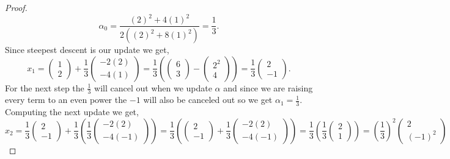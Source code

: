 \documentclass[12pt]{article}
\makeatletter
\theoremstyle{homework}
\newenvironment{exercise}[1]
{\def\@currentlabel{#1}\exercisecore}
{\endexercisecore}
\makeatother
\begin{document}
\begin{exercise}{2.3}
\begin{enumerate}
\begin{proof}
\begin{equation*}
        \alpha_0 = \frac{(2)^2 + 4(1)^2}{2((2)^2 + 8(1)^2)} = \frac{1}{3}. 
      \end{equation*}
      Since steepest descent is our update we get, 
      \begin{equation*}
        x_1 = \begin{pmatrix}
          1\\
          2
        \end{pmatrix} + \frac{1}{3}\begin{pmatrix}-2(2)\\-4(1)\end{pmatrix} = \frac{1}{3} \left(\begin{pmatrix}6\\ 3\end{pmatrix}  - \begin{pmatrix} 2^2\\ 4\end{pmatrix}\right) = \frac{1}{3} \begin{pmatrix} 2\\ -1\end{pmatrix}.
      \end{equation*}
      For the next step the $\frac{1}{3}$ will cancel out when we update $\alpha$ and since we are raising every term to
      an even power the $-1$ will also be canceled out so we get $\alpha_1 = \frac{1}{3}$. Computing the next update we get, 
      \begin{equation*}
        x_2 = \frac{1}{3}\begin{pmatrix} 2\\ -1\end{pmatrix} + \frac{1}{3}\left(\frac{1}{3} \begin{pmatrix}-2(2)\\ -4(-1)\end{pmatrix}\right) = \frac{1}{3} \left(  \begin{pmatrix} 2\\ -1\end{pmatrix} + \frac{1}{3} \begin{pmatrix}-2(2)\\ -4(-1)\end{pmatrix}\right) = \frac{1}{3}\left( \frac{1}{3} \begin{pmatrix} 2\\ 1\end{pmatrix} \right) = \left(\frac{1}{3}\right)^2 \begin{pmatrix}2\\ (-1)^2\end{pmatrix}

\end{equation*}
\end{proof}
\end{enumerate}
\end{exercise}
\end{document}

